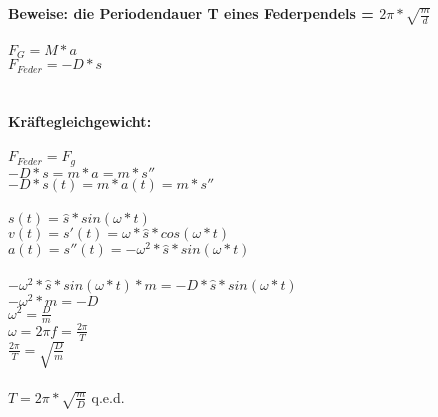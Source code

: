 \documentclass[12pt, a4paper]{article}
\begin{document}
\textbf{Beweise: die Periodendauer T eines Federpendels = $2\pi*\sqrt{\frac{m}{d}}$}\\
\\
$F_G = M*a$\\
$F_{Feder}=-D*s$\\
\\
\\
\textbf{Kr\"aftegleichgewicht:}\\\\
$F_{Feder}=F_g$\\
$-D*s=m*a=m*s''$\\
$-D*s(t)=m*a(t)=m*s''$\\
\\
$s(t) = \hat{s}*sin(\omega * t)$\\
$v(t) = s'(t) = \omega * \hat{s} * cos(\omega * t)$\\
$a(t) = s''(t) = -\omega^2 * \hat{s}*sin(\omega * t)$\\
\\
$-\omega^2 * \hat{s} * sin(\omega * t) * m = -D * \hat{s} * sin(\omega * t)$\\
$-\omega^2*m = -D$\\
$\omega^2 = \frac{D}{m}$\\
$\omega = 2\pi f = \frac{2\pi}{T}$\\
$\frac{2\pi}{T}=\sqrt{\frac{D}{m}}$\\
\\
$T=2\pi*\sqrt{\frac{m}{D}}$ q.e.d.
\end{document}

